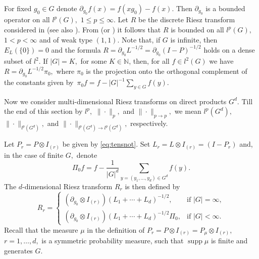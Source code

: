 \documentclass[leqno,12pt]{amsart}
\theoremstyle{definition}
\theoremstyle{remark}
\begin{document}
For fixed $g_0\in G$ denote $\partial_{g_0} f(x)=f(xg_0)-f(x).$ Then $\partial_{g_0}$ is a bounded operator on all $l^p(G),$ $1\leq p\leq \infty.$ Let $R$ be the discrete Riesz transform considered in \cite{AlexdisRiesz} (see also \cite{HebSC}). From \cite[Theorem 2.4]{AlexdisRiesz} (or \cite[Section 8]{HebSC}) it follows that $R$ is bounded on all $l^p(G),$ $1<p<\infty$ and of weak type $(1,1).$ Note that, if $G$ is infinite, then $E_{L}(\{0\})=0$ and the formula $R=\partial_{g_0}L^{-1/2}=\partial_{g_0}(I-P)^{-1/2}$ holds on a dense subset of $l^2.$ If $|G|=K,$ for some $K\in\mathbb{N}$, then, for all $f\in l^2(G)$ we have $R=\partial_{g_0}L^{-1/2}\pi_0,$ where $\pi_0$ is the projection onto the orthogonal complement of the constants given by\ $\pi_0f=f-|G|^{-1}\sum_{y\in G}f(y).$

Now we consider multi-dimensional Riesz transforms on direct products $G^d.$ Till the end of this section by $l^p,$ $\|\cdot\|_p,$ and $\|\cdot\|_{p\to p},$ we mean $l^p(G^d),$ $\|\cdot\|_{l^p(G^d)},$ and $\|\cdot\|_{l^p(G^d)\to l^p(G^d)},$ respectively.

Let $P_r=P\otimes I_{(r)}$ be given by \eqref{eq:tensnot}. Set $L_r=L\otimes I_{(r)}=(I-P_r)$ and, in the case of finite $G,$ denote \begin{equation}\label{sec:disc,eq:Pi0def}\Pi_0f=f-\frac{1}{|G|^d}\sum_{y=(y_1,\ldots,y_d)\in G^d}f(y).\end{equation} The $d$-dimensional Riesz transform $R_r$ is then defined by \begin{equation}\label{sec:disc,eq:Rieszmultdef}
R_r=\left\{ \begin{array}{lr}
 (\partial_{g_0}\otimes I_{(r)})(L_1+\cdots +L_d)^{-1/2}, &\mbox{if $|G|=\infty$}, \\
 (\partial_{g_0}\otimes I_{(r)})(L_1+\cdots +L_d)^{-1/2}\Pi_0, &\mbox{if $|G|<\infty.$}
       \end{array} \right.
\end{equation}
Recall that the measure $\mu$ in the definition of $P_r=P\otimes I_{(r)}=P_{\mu}\otimes I_{(r)},$ $r=1,\ldots,d,$ is a symmetric probability measure, such that $\operatorname{supp} \mu$ is finite and generates $G$.
\end{document}
